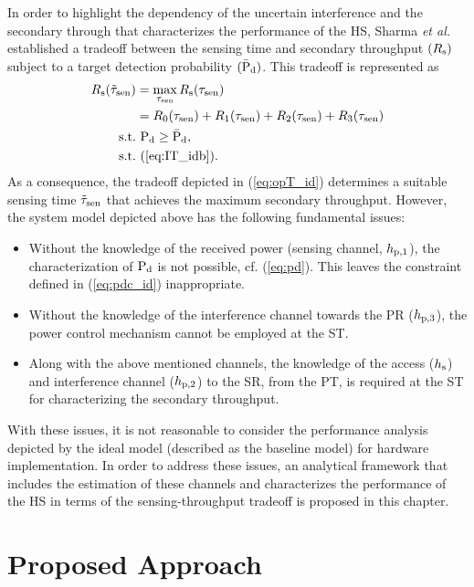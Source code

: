 In order to highlight the dependency of the uncertain interference and the secondary through that characterizes the performance of the HS, Sharma \textit{et al.} \cite{Sharma14} established a tradeoff between the sensing time and secondary throughput $(R_{\text{s}})$ subject to a target detection probability $(\bar{\text{P}}_{\text{d}})$. This tradeoff is represented as
\begin{align}
R_{\text{s}}(\tilde{\tau}_{\text{sen}}) &= \operatorname*{max}_{\tau_{\text{sen}}} R_{\text{s}}(\tau_{\text{sen}}) \label{eq:opT_id}\\ 
\quad &= R_{\text{0}}(\tau_{\text{sen}}) + R_{\text{1}}(\tau_{\text{sen}}) + R_{\text{2}}(\tau_{\text{sen}}) + R_{\text{3}}(\tau_{\text{sen}}) \nonumber  \\
\text{s.t.} & \text{ } \text{P}_{\text{d}} \ge \bar{\text{P}}_{\text{d}}, \label{eq:pdc_id} \\ 
\text{s.t.} & \text{ } (\ref{eq:IT_idb}). \nonumber
\end{align}
As a consequence, the tradeoff depicted in (\ref{eq:opT_id}) determines a suitable sensing time $\tilde{\tau}_{\text{sen}}$ that achieves the maximum secondary throughput.
However, the system model depicted above has the following fundamental issues:
\begin{itemize}
\item Without the knowledge of the received power (sensing channel, $h_{\text{p,1}}$), the characterization of $\text{P}_{\text{d}}$ is not possible, cf. (\ref{eq:pd}). This leaves the constraint defined in (\ref{eq:pdc_id}) inappropriate. 
\item Without the knowledge of the interference channel towards the PR ($h_{\text{p,3}}$), the power control mechanism cannot be employed at the ST.
\item Along with the above mentioned channels, the knowledge of the access ($h_{\text{s}}$) and interference channel ($h_{\text{p,2}}$) to the SR, from the PT, is required at the ST for characterizing the secondary throughput. 
\end{itemize} 
With these issues, it is not reasonable to consider the performance analysis depicted by the ideal model (described as the baseline model) for hardware implementation. In order to address these issues, an analytical framework that includes the estimation of these channels and characterizes the performance of the HS in terms of the sensing-throughput tradeoff is proposed in this chapter. 
\section{Proposed Approach} \label{sec:pm}
